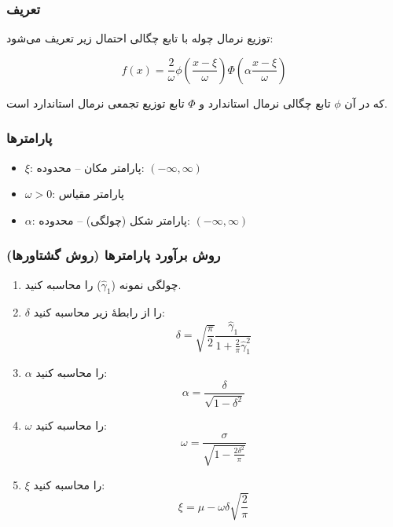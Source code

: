 \documentclass[a4paper,12pt]{article}
\begin{document}
\subsubsection{تعریف}

توزیع نرمال چوله با تابع چگالی احتمال زیر تعریف می‌شود:

\begin{equation}
f(x) = \frac{2}{\omega} \phi\left(\frac{x-\xi}{\omega}\right) \Phi\left(\alpha\frac{x-\xi}{\omega}\right)
\end{equation}

که در آن $\phi$ تابع چگالی نرمال استاندارد و $\Phi$ تابع توزیع تجمعی نرمال استاندارد است.

\subsubsection{پارامترها}

\begin{itemize}
\item $\xi$: پارامتر مکان – محدوده: $(-\infty, \infty)$
\item $\omega > 0$: پارامتر مقیاس
\item $\alpha$: پارامتر شکل (چولگی) – محدوده: $(-\infty, \infty)$
\end{itemize}

\subsubsection{روش برآورد پارامترها (روش گشتاورها)}

\begin{enumerate}
\item چولگی نمونه ($\hat{\gamma}_1$) را محاسبه کنید.
\item $\delta$ را از رابطهٔ زیر محاسبه کنید:
\begin{equation}
\delta = \sqrt{\frac{\pi}{2}} \frac{\hat{\gamma}_1}{1 + \frac{2}{\pi}\hat{\gamma}_1^2}
\end{equation}
\item $\alpha$ را محاسبه کنید:
\begin{equation}
\alpha = \frac{\delta}{\sqrt{1-\delta^2}}
\end{equation}
\item $\omega$ را محاسبه کنید:
\begin{equation}
\omega = \frac{\sigma}{\sqrt{1 - \frac{2\delta^2}{\pi}}}
\end{equation}
\item $\xi$ را محاسبه کنید:
\begin{equation}
\xi = \mu - \omega\delta\sqrt{\frac{2}{\pi}}
\end{equation}
\end{enumerate}
\end{document}
